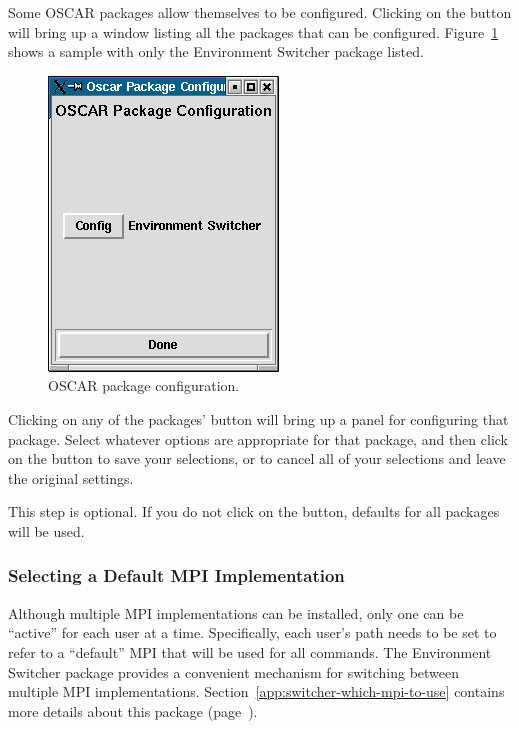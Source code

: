 \optional

Some OSCAR packages allow themselves to be configured.  Clicking on
the  button will bring up a
window listing all the packages that can be configured.
Figure~\ref{fig:detailed-package-configuration} shows a sample with
only the Environment Switcher package listed.

\begin{figure}[htbp]
  \begin{center}
    \includegraphics[scale=\imgscale]{figs/package-configuration}
    \caption{OSCAR package configuration.}
    \label{fig:detailed-package-configuration}
  \end{center}
\end{figure}

Clicking on any of the packages'  button will bring up
a panel for configuring that package.  Select whatever options are
appropriate for that package, and then click on the  button to save your selections, or  to cancel all of your selections and leave the original
settings.

This step is optional.  If you do not click on the  button, defaults for all packages will be
used.


\subsubsection{Selecting a Default MPI Implementation}
\label{det:configure-packages-switcher}

Although multiple MPI implementations can be installed, only one can
be ``active'' for each user at a time.  Specifically, each user's path
needs to be set to refer to a ``default'' MPI that will be used for
all commands.  The Environment Switcher package provides a convenient
mechanism for switching between multiple MPI implementations.
Section~\ref{app:switcher-which-mpi-to-use} contains more details
about this package (page~\pageref{app:switcher-which-mpi-to-use}).

